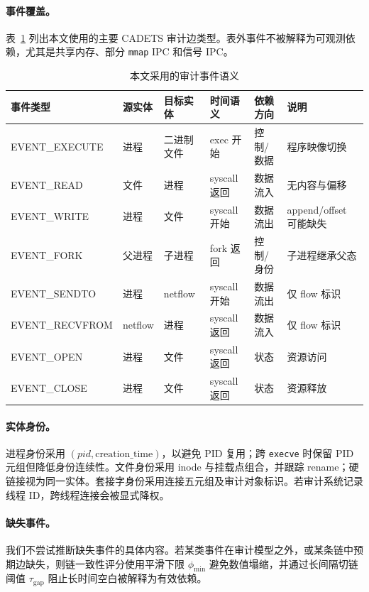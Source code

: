 \paragraph{事件覆盖。}表~\ref{tab:event_semantics} 列出本文使用的主要 CADETS 审计边类型。表外事件不被解释为可观测依赖，尤其是共享内存、部分 \texttt{mmap} IPC 和信号 IPC。

\begin{table}[t]
\centering
\caption{本文采用的审计事件语义}
\label{tab:event_semantics}
\small
\begin{tabular}{llllll}
\toprule
事件类型 & 源实体 & 目标实体 & 时间语义 & 依赖方向 & 说明 \\
\midrule
EVENT\_EXECUTE & 进程 & 二进制文件 & exec 开始 & 控制/数据 & 程序映像切换 \\
EVENT\_READ & 文件 & 进程 & syscall 返回 & 数据流入 & 无内容与偏移 \\
EVENT\_WRITE & 进程 & 文件 & syscall 开始 & 数据流出 & append/offset 可能缺失 \\
EVENT\_FORK & 父进程 & 子进程 & fork 返回 & 控制/身份 & 子进程继承父态 \\
EVENT\_SENDTO & 进程 & netflow & syscall 开始 & 数据流出 & 仅 flow 标识 \\
EVENT\_RECVFROM & netflow & 进程 & syscall 返回 & 数据流入 & 仅 flow 标识 \\
EVENT\_OPEN & 进程 & 文件 & syscall 返回 & 状态 & 资源访问 \\
EVENT\_CLOSE & 进程 & 文件 & syscall 返回 & 状态 & 资源释放 \\
\bottomrule
\end{tabular}
\end{table}

\paragraph{实体身份。}进程身份采用 $(pid,\text{creation\_time})$，以避免 PID 复用；跨 \texttt{execve} 时保留 PID 元组但降低身份连续性。文件身份采用 inode 与挂载点组合，并跟踪 rename；硬链接视为同一实体。套接字身份采用连接五元组及审计对象标识。若审计系统记录线程 ID，跨线程连接会被显式降权。

\paragraph{缺失事件。}
\label{sec:audit_missing}
我们不尝试推断缺失事件的具体内容。若某类事件在审计模型之外，或某条链中预期边缺失，则链一致性评分使用平滑下限 $\phi_{\min}$ 避免数值塌缩，并通过长间隔切链阈值 $\tau_{\text{gap}}$ 阻止长时间空白被解释为有效依赖。

